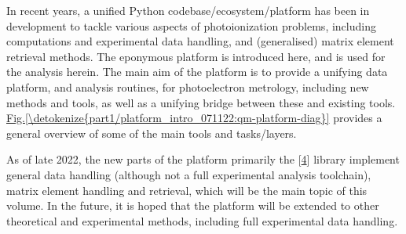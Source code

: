 \documentclass[letterpaper,table,10pt,english]{jupyterBook}
\begin{document}
\sphinxAtStartPar
In recent years, a unified Python codebase/ecosystem/platform has been in development to tackle various aspects of photoionization problems, including  computations and experimental data handling, and (generalised) matrix element retrieval methods. The eponymous  platform is introduced here, and is used for the analysis herein. The main aim of the platform is to provide a unifying data platform, and analysis routines, for photoelectron metrology, including new methods and tools, as well as a unifying bridge between these and existing tools. \hyperref[\detokenize{part1/platform_intro_071122:qm-platform-diag}]{Fig.\@ \ref{\detokenize{part1/platform_intro_071122:qm-platform-diag}}} provides a general overview of some of the main tools and tasks/layers.

\sphinxAtStartPar
As of late 2022, the new parts of the platform \sphinxhyphen{} primarily the  {[}\hyperlink{cite.backmatter/bibliography:id618}{4}{]} library \sphinxhyphen{} implement general data handling (although not a full experimental analysis toolchain), matrix element handling and retrieval, which will be the main topic of this volume.
In the future, it is hoped that the platform will be extended to other theoretical and experimental methods, including full experimental data handling.
\end{document}
